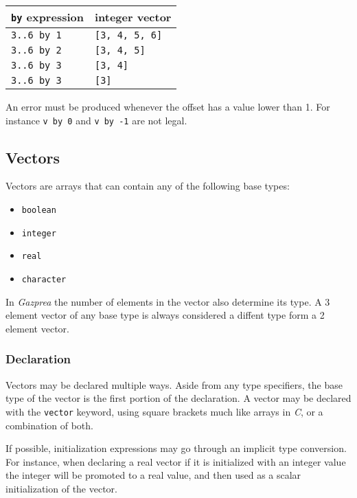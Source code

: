 \documentclass[../../gazprea.tex]{subfiles}
\begin{document}
		\begin{center}
			\begin{tabular}{|l|l|}
			\hline
			\textbf{\texttt{by} expression} & \textbf{integer vector} \\
			\hline
			\texttt{3..6 by 1} & \texttt{[3, 4, 5, 6]} \\
			\texttt{3..6 by 2} & \texttt{[3, 4, 5]}    \\
			\texttt{3..6 by 3} & \texttt{[3, 4]}       \\
			\texttt{3..6 by 3} & \texttt{[3]}          \\
			\hline
			\end{tabular}
		\end{center}

		An error must be produced whenever the offset has a value lower than 1. For instance \texttt{v by 0} and
		\texttt{v by -1} are not legal.


	\subsection{Vectors}\label{sec:vector}

		Vectors are arrays that can contain any of the following base types:
		\begin{itemize}
			\item \texttt{boolean}
			\item \texttt{integer}
			\item \texttt{real}
			\item \texttt{character}
		\end{itemize}

		In \textit{Gazprea} the number of elements in the vector also determine its type. A 3 element vector of any base
		type is always considered a diffent type form a 2 element vector.

		\subsubsection{Declaration}

			Vectors may be declared multiple ways. Aside from any type specifiers, the base type of the vector is the
			first portion of the declaration. A vector may be declared with the \texttt{vector} keyword, using square
			brackets much like arrays in \textit{C}, or a combination of both.

			If possible, initialization expressions may go through an implicit type conversion. For instance, when
			declaring a real vector if it is initialized with an integer value the integer will be promoted to a real
			value, and then used as a scalar initialization of the vector.
\end{document}
